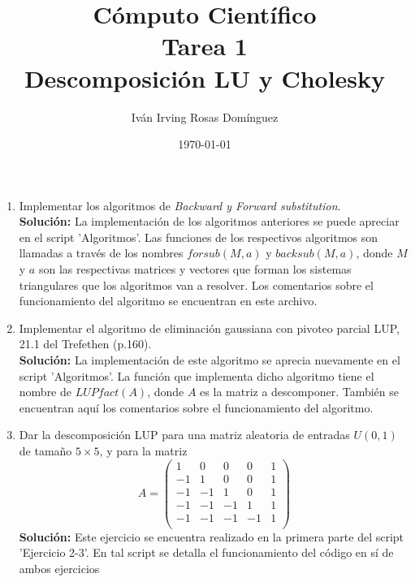 \documentclass[letterpaper]{article}
\title{\textbf{Cómputo Científico\\
Tarea 1\\
Descomposición LU y Cholesky}}
\author{Iván Irving Rosas Domínguez}
\date{\today}
\newcommand{\1}{\mathds{1}}
\theoremstyle{definition}
\theoremstyle{definition}
\theoremstyle{definition}
\theoremstyle{definition}
\theoremstyle{definition}
\begin{document}
\maketitle


\begin{enumerate}
    \item Implementar los algoritmos de \textit{Backward y Forward substitution}.\\
    
    \textbf{Solución:} La implementación de los algoritmos anteriores se
     puede apreciar en el script 'Algoritmos'. Las funciones de los respectivos
     algoritmos son llamadas a través de los nombres $forsub(M,a)$ y $backsub(M,a)$,
     donde $M$ y $a$ son las respectivas matrices y vectores que forman los
     sistemas triangulares que los algoritmos van a resolver. Los comentarios sobre
     el funcionamiento del algoritmo se encuentran en este archivo.

    \item Implementar el algoritmo de eliminación gaussiana con pivoteo parcial LUP,
    21.1 del Trefethen (p.160).\\

    \textbf{Solución:} La implementación de este algoritmo se aprecia nuevamente en
    el script 'Algoritmos'. La función que implementa dicho algoritmo tiene el nombre
    de $LUPfact(A)$, donde $A$ es la matriz a descomponer. También se encuentran aquí
    los comentarios sobre el funcionamiento del algoritmo.

    \item Dar la descomposición LUP para una matriz aleatoria de entradas $U(0,1)$
    de tamaño $5\times5$, y para la matriz
    \[
        A=
        \begin{pmatrix}
          1 & 0 & 0 & 0 & 1\\
         -1 & 1 & 0 & 0 & 1\\
         -1 & -1 & 1 & 0 & 1\\
         -1 & -1 & -1 & 1 & 1\\
         -1 & -1 & -1 & -1 & 1\\
        \end{pmatrix}
    \]
    \textbf{Solución:} Este ejercicio se encuentra realizado en la primera parte del script 'Ejercicio 2-3'.
    En tal script se detalla el funcionamiento del código en sí de ambos ejercicios\\


\end{enumerate}
\end{document}
